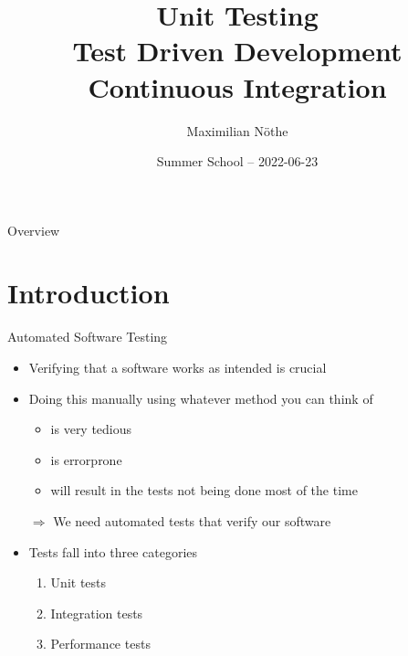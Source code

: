 
\author[M. Nöthe]{Maximilian Nöthe}
\title[Testing]{Unit Testing \\ Test Driven Development \\ Continuous Integration}
\date[2021-06-10]{%
  \Large Summer School – 2022-06-23
}


\maketitle

\begin{frame}[c]{Overview}
  \tableofcontents
\end{frame}

\copywarning{}

\section{Introduction}

\begin{frame}[c]{Automated Software Testing}
  \begin{itemize}
    \item Verifying that a software works as intended is crucial
    \item Doing this manually using whatever method you can think of
      \begin{itemize}
        \item is very tedious
        \item is errorprone
        \item will result in the tests not being done most of the time
      \end{itemize}
    \item[$\Rightarrow$] We need automated tests that verify our software
    \item Tests fall into three categories
      \begin{enumerate}
        \item Unit tests
        \item Integration tests
        \item Performance tests
      \end{enumerate}
  \end{itemize}
\end{frame}

